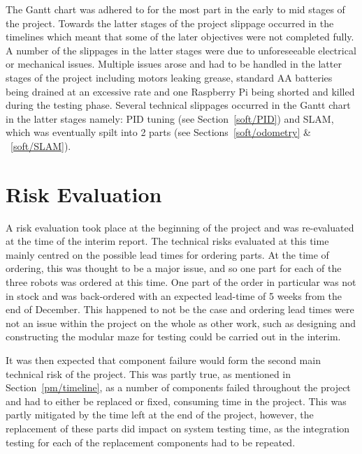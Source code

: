 The Gantt chart was adhered to for the most part in the early to 
mid stages of the project. Towards the latter stages of the 
project slippage occurred in the timelines which meant that some 
of the later objectives were not completed fully. A number 
of the slippages in the latter stages were due to unforeseeable 
electrical or mechanical issues. Multiple issues arose and had to 
be handled in the latter stages of the project including motors 
leaking grease, standard AA batteries being drained at an 
excessive rate and one Raspberry Pi being shorted and killed 
during the testing phase. Several technical slippages occurred in the Gantt 
chart in the latter stages namely: PID tuning (see Section~\ref{soft/PID}) and SLAM, which was eventually spilt into 2 parts (see Sections~\ref{soft/odometry} \& ~\ref{soft/SLAM}).

\section{Risk Evaluation}\label{pm/riskeval}
A risk evaluation took place at the beginning of the project and 
was re-evaluated at the time of the interim report. The technical 
risks evaluated at this time mainly centred on the possible lead 
times for ordering parts. At the time of ordering, this was 
thought to be a major issue, and so one part for each of the three 
robots was ordered at this time. One part of the order in 
particular was not in stock and was back-ordered with an expected 
lead-time of 5 weeks from the end of December. This happened to 
not be the case and ordering lead times were not an issue within 
the project on the whole as other work, such as designing and 
constructing the modular maze for testing could be carried out in 
the interim. 

It was then expected that component failure would form the second 
main technical risk of the project. This was partly true, as 
mentioned in Section~\ref{pm/timeline}, as a number of components 
failed throughout the project and had to either be replaced or 
fixed, consuming time in the project. This was partly mitigated by 
the time left at the end of the project, however, the replacement 
of these parts did impact on system testing time, as the 
integration testing for each of the replacement components had to 
be repeated. 


